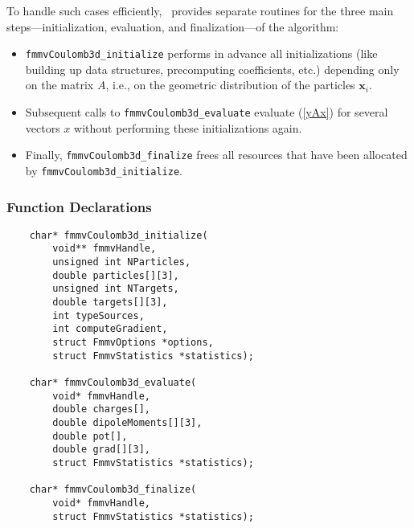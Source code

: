 To handle such cases efficiently, \fmmv\
provides separate routines for the three main steps---initialization, 
evaluation, and finalization---of the algorithm:
\begin{itemize}
\item %
\verb|fmmvCoulomb3d_initialize| performs in advance
all initializations 
(like building up data structures, precomputing coefficients, etc.) 
depending only on the matrix $A$, i.e., on
the geometric distribution of the particles $\mathbf{x}_i$.
\item Subsequent calls to \verb|fmmvCoulomb3d_evaluate| evaluate (\ref{yAx}) for
several vectors $x$ %
without performing these initializations again.
\item Finally, \verb|fmmvCoulomb3d_finalize| frees all resources  that have been
allocated by
 \verb|fmmvCoulomb3d_initialize|.
\end{itemize}

\subsubsection*{Function Declarations}
\begin{verbatim}
    char* fmmvCoulomb3d_initialize(
        void** fmmvHandle,
        unsigned int NParticles, 
        double particles[][3], 
        unsigned int NTargets, 
        double targets[][3],
        int typeSources,  
        int computeGradient, 
        struct FmmvOptions *options, 
        struct FmmvStatistics *statistics); 

    char* fmmvCoulomb3d_evaluate(
        void* fmmvHandle,
        double charges[],
        double dipoleMoments[][3],
        double pot[],      	
        double grad[][3], 	
        struct FmmvStatistics *statistics); 

    char* fmmvCoulomb3d_finalize(
        void* fmmvHandle,
        struct FmmvStatistics *statistics); 
        \end{verbatim}
